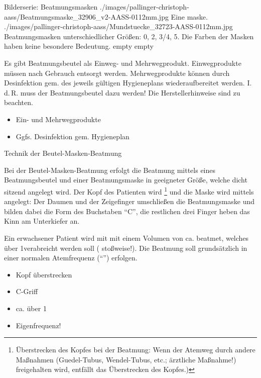 \begin{PictureSeries}{}{Bilderserie: Beatmungsmasken}
{./images/pallinger-christoph-aass/Beatmungsmaske_32906_v2-AASS-0112mm.jpg}
{Eine maske. }
{./images/pallinger-christoph-aass/Mundstuecke_32723-AASS-0112mm.jpg}
{Beatmungsmasken unterschiedlicher Größen:
0, 2, 3/4, 5. Die Farben der Masken haben
keine besondere Bedeutung. }
{empty}
{}
{empty}
{}
\end{PictureSeries}


{%
Es gibt Beatmungsbeutel als Einweg- und Mehrwegprodukt.
Einwegprodukte müssen nach Gebrauch entsorgt werden.
Mehrwegprodukte können durch Desinfektion gem.
des jeweils gültigen Hygieneplans wiederaufbereitet werden.
I.\,d.\,R. muss der
Beatmungsbeutel dazu  werden!
Die Herstellerhinweise sind zu beachten.
}{
\begin{itemize}
  \item Ein- und Mehrwegprodukte
  \item Ggfs. Desinfektion gem. Hygieneplan
\end{itemize}


}{}{}





{Technik der Beutel-Masken-Beatmung}
{Bei der Beutel-Masken-Beatmung erfolgt die Beatmung mittels
eines Beatmungsbeutel und einer Beatmungsmaske in geeigneter
Größe, welche dicht sitzend angelegt wird.
Der Kopf des Patienten wird
\footnote{Überstrecken des Kopfes bei der
Beatmung: Wenn der Atemweg durch andere Maßnahmen
(Guedel-Tubus, Wendel-Tubus, etc.; ärztliche Maßnahme!)
freigehalten wird, entfällt das Überstrecken des Kopfes.)}
und die Maske wird mittels  angelegt: Der Daumen
und der Zeigefinger umschließen die Beatmungsmaske und
bilden dabei die Form des Buchstaben \enquote{C}, die
restlichen drei Finger heben das Kinn am Unterkiefer an.

Ein erwachsener Patient wird mit mit einem Volumen von ca.
\EE{500\Ml*} beatmet, welches über 1\Sec* verabreicht werden
soll ( stoßweise!). Die Beatmung soll grundsätzlich
in einer normalen Atemfrequenz
(\enquote{}) erfolgen.
}
{\begin{itemize}
  \item Kopf überstrecken
  \item C-Griff
  \item ca. \EE{500\Ml*} über 1\Sec*
  \item Eigenfrequenz!
\end{itemize}

}
{}
{}
{}




